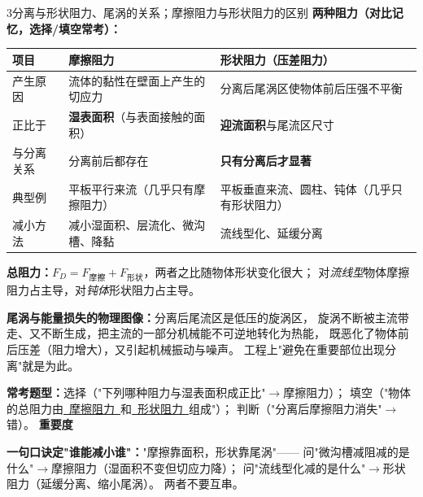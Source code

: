 \begin{kaodian}{3}{分离与形状阻力、尾涡的关系；摩擦阻力与形状阻力的区别}
\textbf{两种阻力（对比记忆，选择/填空常考）：}
\begin{center}
\begin{tabularx}{\textwidth}{@{}lXX@{}}
\toprule
项目 & \textbf{摩擦阻力} & \textbf{形状阻力（压差阻力）} \\
\midrule
产生原因 & 流体的黏性在壁面上产生的切应力 & 分离后尾涡区使物体前后压强不平衡 \\
正比于 & \textbf{湿表面积}（与表面接触的面积） & \textbf{迎流面积}与尾流区尺寸 \\
与分离关系 & 分离前后都存在 & \textbf{只有分离后才显著} \\
典型例 & 平板平行来流（几乎只有摩擦阻力） & 平板垂直来流、圆柱、钝体（几乎只有形状阻力） \\
减小方法 & 减小湿面积、层流化、微沟槽、降黏 & 流线型化、延缓分离 \\
\bottomrule
\end{tabularx}
\end{center}

\textbf{总阻力：}$F_D=F_{\text{摩擦}}+F_{\text{形状}}$，两者之比随物体形状变化很大；
对\emph{流线型}物体摩擦阻力占主导，对\emph{钝体}形状阻力占主导。

\textbf{尾涡与能量损失的物理图像：}分离后尾流区是低压的旋涡区，
旋涡不断被主流带走、又不断生成，把主流的一部分机械能不可逆地转化为热能，
既恶化了物体前后压差（阻力增大），又引起机械振动与噪声。
工程上"避免在重要部位出现分离"就是为此。

\textbf{常考题型：}选择（"下列哪种阻力与湿表面积成正比"$\to$摩擦阻力）；
填空（"物体的总阻力由\underline{\ 摩擦阻力\ }和\underline{\ 形状阻力\ }组成"）；
判断（"分离后摩擦阻力消失"$\to$错）。
\textbf{重要度 }\quad{}\quad{}

\begin{banfa}
\textbf{一句口诀定"谁能减小谁"：}"摩擦靠面积，形状靠尾涡"——
问"微沟槽减阻减的是什么"$\to$摩擦阻力（湿面积不变但切应力降）；
问"流线型化减的是什么"$\to$形状阻力（延缓分离、缩小尾涡）。
两者不要互串。
\end{banfa}
\end{kaodian}

